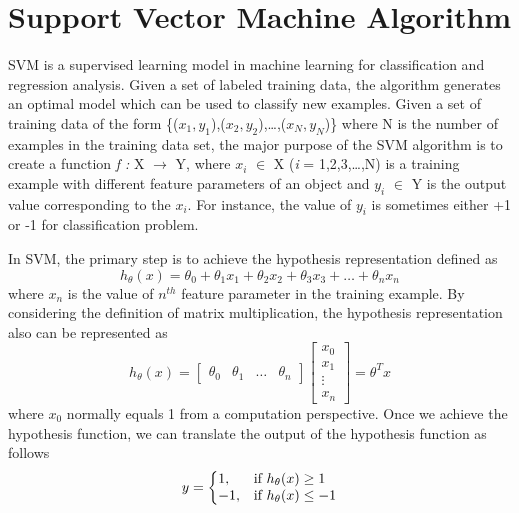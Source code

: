 \section{Support Vector Machine Algorithm}
SVM is a supervised learning model in machine learning for classification and regression analysis\cite{Cortes}. Given a set of labeled training data, the algorithm generates an optimal model which can be used to classify new examples. Given a set of training data of the form \{($x_1,y_1$),($x_2,y_2$),\ldots,($x_N,y_N$)\} where N is the number of examples in the training data set, the major purpose of the SVM algorithm is to create a function 
\textit{f :} X $\rightarrow$ Y,
where $x_i$ $\in$ X (\textit{i} = 1,2,3,\ldots,N) is a training example with different feature parameters of an object and $y_i$ $\in$ Y is the output value corresponding to the $x_i$. For instance, the value of $y_i$ is sometimes either +1 or -1 for classification problem.   
\par
In SVM, the primary step is to achieve the hypothesis representation defined as 
\begin{equation}
    h_\theta(x) = \theta _0 + \theta_1x_1 + \theta_2x_2 + \theta_3x_3 + \dots + \theta_nx_n 
\end{equation}
where $x_n$ is the value of $n^{th}$ feature parameter in the training example. By considering the definition of matrix multiplication, the hypothesis representation also can be represented as 
\begin{equation}
    h_\theta(x) = 
    \begin{bmatrix}
        \theta_0 & \theta_1 & \dots & \theta_n
    \end{bmatrix}
    \begin{bmatrix}
        x_0\\
        x_1\\
        \vdots\\
        x_n
    \end{bmatrix}
    = \theta^Tx
\end{equation}
where $x_0$ normally equals 1 from a computation perspective. Once we achieve the hypothesis function, we can translate the output of the hypothesis function as follows
\begin{equation}
     y=\left\{
  \begin{array}{@{}ll@{}}
    1, & \text{if}\ h_\theta(x) \geq 1 \\
    -1, & \text{if}\ h_\theta(x) \leq -1
  \end{array}\right.
\end{equation}
